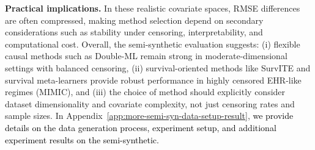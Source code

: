 \documentclass{article} %
\newcommand{\rebuttal}[1]{\textcolor{black}{#1}}
\begin{document}


\textbf{Practical implications.} In these realistic covariate spaces, RMSE differences are often compressed, making method selection depend on secondary considerations such as stability under censoring, interpretability, and computational cost. Overall, the semi-synthetic evaluation suggests: (i) flexible causal methods such as Double-ML remain strong in moderate-dimensional settings with balanced censoring, (ii) survival-oriented methods like SurvITE and survival meta-learners provide robust performance in highly censored EHR-like regimes (MIMIC), and (iii) the choice of method should explicitly consider dataset dimensionality and covariate complexity, not just censoring rates and sample sizes. 
In Appendix~\ref{app:more-semi-syn-data-setup-result}, \rebuttal{we provide details on the data generation process, experiment setup, and additional experiment results on the semi-synthetic.}


\end{document}
